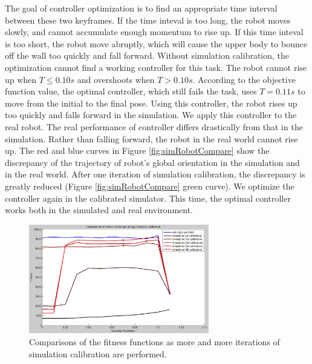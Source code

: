 The goal of controller optimization is to find an appropriate time interval between these two keyframes. If the time inteval is too long, the robot moves slowly, and cannot accumulate enough momentum to rise up. If this time inteval is too short, the robot move abruptly, which will cause the upper body to bounce off the wall too quickly and fall forward. Without simulation calibration, the optimization cannot find a working controller for this task. The robot cannot rise up when $T\leq 0.10s$ and overshoots when $T > 0.10s$. According to the objective function value, the optimal controller, which still fails the task, uses $T=0.11s$ to move from the initial to the final pose. Using this controller, the robot rises up too quickly and falls forward in the simulation. We apply this controller to the real robot. The real performance of controller differs drastically from that in the simulation. Rather than falling forward, the robot in the real world cannot rise up. The red and blue curves in Figure \ref{fig:simRobotCompare} show the discrepancy of the trajectory of robot's global orientation in the simulation and in the real world. After one iteration of simulation calibration, the discrepancy is greatly reduced (Figure \ref{fig:simRobotCompare} green curve). We optimize the controller again in the calibrated simulator. This time, the optimal controller works both in the simulated and real environment.

\begin{figure}[!t]
  \centering
  \includegraphics[width=0.7\textwidth]{figures/fitnessLandscape}
  \caption{Comparisons of the fitness functions as more and more iterations of simulation calibration are performed.}
  \label{fig:fitnessLandscape}
\end{figure}


